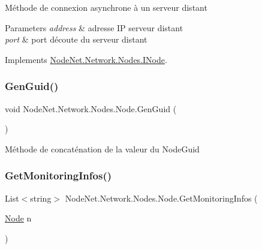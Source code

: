 Méthode de connexion asynchrone à un serveur distant 


\begin{DoxyParams}{Parameters}
{\em address} & adresse IP serveur distant\\
\hline
{\em port} & port d\textquotesingle{}écoute du serveur distant\\
\hline
\end{DoxyParams}


Implements \hyperlink{interface_node_net_1_1_network_1_1_nodes_1_1_i_node_a639c5f1dc82ca81b531ab7efb41ab404}{Node\+Net.\+Network.\+Nodes.\+I\+Node}.

\mbox{\label{class_node_net_1_1_network_1_1_nodes_1_1_node_aefc346ee9ebf697f8f7c346deee276d7}} 
\subsubsection{\texorpdfstring{Gen\+Guid()}{GenGuid()}}
{\footnotesize\ttfamily void Node\+Net.\+Network.\+Nodes.\+Node.\+Gen\+Guid (\begin{DoxyParamCaption}{ }\end{DoxyParamCaption})\hspace{0.3cm}{\ttfamily [protected]}}



Méthode de concaténation de la valeur du Node\+Guid 

\mbox{\label{class_node_net_1_1_network_1_1_nodes_1_1_node_a9d07bf5dae221854d15c1d6fc33cbb9c}} 
\subsubsection{\texorpdfstring{Get\+Monitoring\+Infos()}{GetMonitoringInfos()}}
{\footnotesize\ttfamily List$<$string$>$ Node\+Net.\+Network.\+Nodes.\+Node.\+Get\+Monitoring\+Infos (\begin{DoxyParamCaption}\item[{\hyperlink{class_node_net_1_1_network_1_1_nodes_1_1_node}{Node}}]{n }\end{DoxyParamCaption})}



